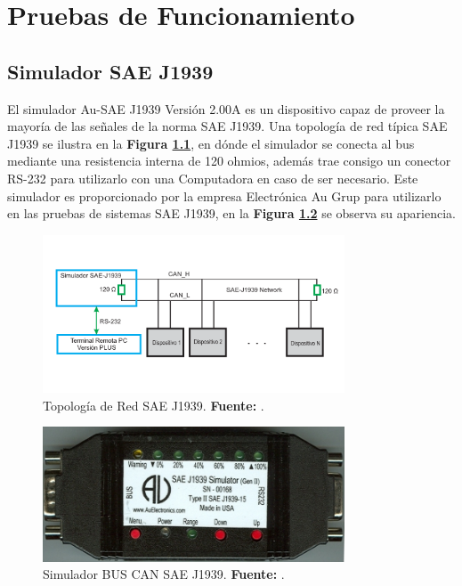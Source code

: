 \chapter[Capítulo 6. Pruebas de Funcionamiento]{Pruebas de Funcionamiento}

\section{Simulador SAE J1939}

El simulador Au-SAE J1939 Versión 2.00A es un dispositivo capaz de proveer la mayoría de las señales de la norma SAE J1939. Una topología de red típica SAE J1939 se ilustra en la \textbf{Figura \ref{TPSAE}}, en dónde el simulador se conecta al bus mediante una resistencia interna de 120 ohmios, además trae consigo un conector RS-232 para utilizarlo con una Computadora en caso de ser necesario. Este simulador es proporcionado por la empresa Electrónica Au Grup para utilizarlo en las pruebas de sistemas SAE J1939, en la \textbf{Figura \ref{Sim}} se observa su apariencia. 

\begin{figure}[H]
	\centering
		\includegraphics[width=0.8\textwidth]{./Cap6imagen/EjemploSimulador.pdf}
	\caption[Topología de Red SAE J1939.]{Topología de Red SAE J1939.\textbf{ Fuente:} \cite{UserM}.}
	\label{TPSAE} %
\end{figure}



\begin{figure}[H]
	\centering
		\includegraphics[width=0.8\textwidth]{./Cap6imagen/Simulador.png}
	\caption[Simulador BUS CAN SAE J1939.]{Simulador BUS CAN SAE J1939.\textbf{ Fuente:} \cite{UserM}.}
	\label{Sim} %
\end{figure}
